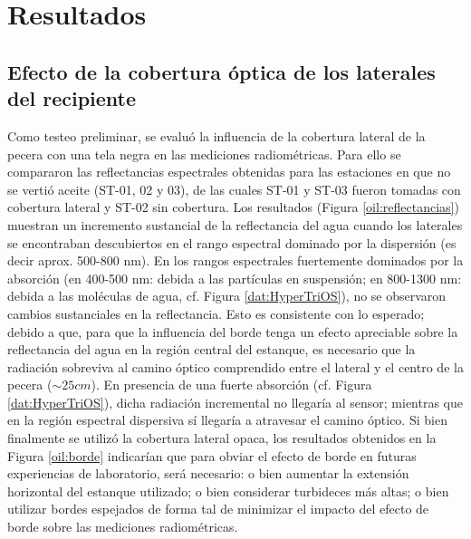 \section{Resultados}
\label{oil:s:resultados}

    \subsection{Efecto de la cobertura óptica de los laterales del recipiente}
    \label{oil:s:cobertura}
    
        Como testeo preliminar, se evaluó la influencia de la cobertura lateral de la pecera con una tela negra en las mediciones radiométricas. Para ello se compararon las reflectancias espectrales obtenidas para las estaciones en que no se vertió aceite (ST-01, 02 y 03), de las cuales ST-01 y ST-03 fueron tomadas con cobertura lateral y ST-02 sin cobertura. Los resultados (Figura \ref{oil:reflectancias}) muestran un incremento sustancial de la reflectancia del agua cuando los laterales se encontraban descubiertos en el rango espectral dominado por la dispersión (es decir aprox. 500-800 nm). En los rangos espectrales fuertemente dominados por la absorción (en 400-500 nm: debida a las partículas en suspensión; en 800-1300 nm: debida a las moléculas de agua, cf. Figura \ref{dat:HyperTriOS}), no se observaron cambios sustanciales en la reflectancia. Esto es consistente con lo esperado; debido a que, para que la influencia del borde tenga un efecto apreciable sobre la reflectancia del agua en la región central del estanque, es necesario que la radiación sobreviva al camino óptico comprendido entre el lateral y el centro de la pecera ($\sim 25 cm$). En presencia de una fuerte absorción (cf. Figura \ref{dat:HyperTriOS}), dicha radiación incremental no llegaría al sensor; mientras que en la región espectral dispersiva sí llegaría a atravesar el camino óptico. Si bien finalmente se utilizó la cobertura lateral opaca, los resultados obtenidos en la Figura \ref{oil:borde} indicarían que para obviar el efecto de borde en futuras experiencias de laboratorio, será necesario: o bien aumentar la extensión horizontal del estanque utilizado; o bien considerar turbideces más altas; o bien utilizar bordes espejados de forma tal de minimizar el impacto del efecto de borde sobre las mediciones radiométricas.

